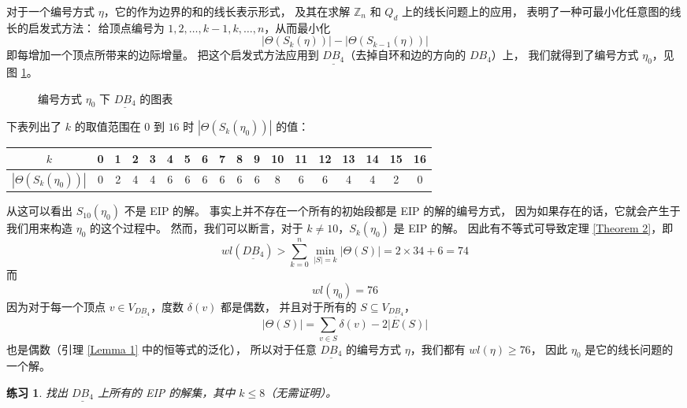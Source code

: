 \documentclass[12pt, a4paper]{article}
\newtheorem{exercise}{练习}
\begin{document}
对于一个编号方式 $\eta$，它的作为边界的和的线长表示形式，
及其在求解 $\mathbb{Z}_n$ 和 $Q_d$ 上的线长问题上的应用，
表明了一种可最小化任意图的线长的启发式方法：
给顶点编号为 $1, 2, \dots, k - 1, k, \dots, n$，从而最小化
\begin{equation*}
|\Theta(S_k(\eta))| - |\Theta(S_{k - 1}(\eta))|
\end{equation*}
即每增加一个顶点所带来的边际增量。
把这个启发式方法应用到 $\underline{DB_4}$（去掉自环和边的方向的 $DB_4$）上，
我们就得到了编号方式 $\eta_0$，见图 \ref{Figure 5}。

\begin{figure}
	\centering
	
	\caption{编号方式 $\eta_0$ 下 $\underline{DB_4}$ 的图表}
	\label{Figure 5}
\end{figure}

下表列出了 $k$ 的取值范围在 $0$ 到 $16$ 时 $|\Theta(S_k(\eta_0))|$ 的值：
\begin{center}
	\begin{tabular}{ c | c c c c c c c c c c c c c c c c c }
	$k$                     & 0 & 1 & 2 & 3 & 4 & 5 & 6 & 7 & 8 & 9 & 10 & 11 & 12 & 13 & 14 & 15 & 16 \\
	\hline
	$|\Theta(S_k(\eta_0))|$ & 0 & 2 & 4 & 4 & 6 & 6 & 6 & 6 & 6 & 6 &  8 &  6 &  6 &  4 &  4 &  2 &  0
	\end{tabular}
\end{center}
从这可以看出 $S_{10}(\eta_0)$ 不是 EIP 的解。
事实上并不存在一个所有的初始段都是 EIP 的解的编号方式，
因为如果存在的话，它就会产生于我们用来构造 $\eta_0$ 的这个过程中。
然而，我们可以断言，对于 $k \neq 10$，$S_k(\eta_0)$ 是 EIP 的解。
因此有不等式可导致定理 \ref{Theorem 2}，即
\begin{equation*}
wl(\underline{DB_4}) > \sum_{k = 0}^n \min_{|S| = k} |\Theta(S)| = 2 \times 34 + 6 = 74
\end{equation*}
而
\begin{equation*}
wl(\eta_0) = 76
\end{equation*}
因为对于每一个顶点 $v \in V_{\underline{DB_4}}$，度数 $\delta(v)$ 都是偶数，
并且对于所有的 $S \subseteq V_{\underline{DB_4}}$，
\begin{equation*}
|\Theta(S)| = \sum_{v \in S} \delta(v) - 2 |E(S)|
\end{equation*}
也是偶数（引理 \ref{Lemma 1} 中的恒等式的泛化），
所以对于任意 $\underline{DB_4}$ 的编号方式 $\eta$，我们都有 $wl(\eta) \ge 76$，
因此 $\eta_0$ 是它的线长问题的一个解。

\begin{exercise}
\label{Exercise 14}
找出 $\underline{DB_4}$ 上所有的 EIP 的解集，其中 $k \le 8$（无需证明）。
\end{exercise}
\end{document}
